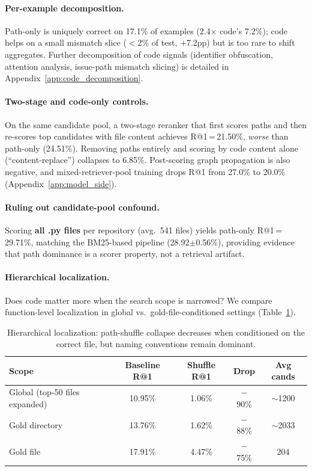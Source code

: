 \documentclass{article}
\begin{document}
\paragraph{Per-example decomposition.}
Path-only is uniquely correct on 17.1\% of examples (2.4$\times$ code's 7.2\%); code helps on a small mismatch slice ($<$2\% of test, $+$7.2pp) but is too rare to shift aggregates.
Further decomposition of code signals (identifier obfuscation, attention analysis, issue-path mismatch slicing) is detailed in Appendix~\ref{app:code_decomposition}.

\paragraph{Two-stage and code-only controls.}
On the same candidate pool, a two-stage reranker that first scores paths and then re-scores top candidates with file content achieves R@1\,=\,21.50\%, \emph{worse} than path-only (24.51\%).
Removing paths entirely and scoring by code content alone (``content-replace'') collapses to 6.85\%.
Post-scoring graph propagation is also negative, and mixed-retriever-pool training drops R@1 from 27.0\% to 20.0\% (Appendix~\ref{app:model_side}).

\paragraph{Ruling out candidate-pool confound.}
Scoring \textbf{all .py files} per repository (avg.\ 541 files) yields path-only R@1\,=\,29.71\%, matching the BM25-based pipeline (28.92$\pm$0.56\%), providing evidence that path dominance is a scorer property, not a retrieval artifact.

\paragraph{Hierarchical localization.}
Does code matter more when the search scope is narrowed?
We compare function-level localization in global vs.\ gold-file-conditioned settings (Table~\ref{tab:hierarchical}).

\begin{table}[h]
\centering
\caption{Hierarchical localization: path-shuffle collapse decreases when conditioned on the correct file, but naming conventions remain dominant.}
\label{tab:hierarchical}
\small
\begin{tabular}{lcccc}
\toprule
\textbf{Scope} & \textbf{Baseline R@1} & \textbf{Shuffle R@1} & \textbf{Drop} & \textbf{Avg cands} \\
\midrule
Global (top-50 files expanded) & 10.95\% & 1.06\% & $-$90\% & $\sim$1200 \\
Gold directory & 13.76\% & 1.62\% & $-$88\% & $\sim$2033 \\
Gold file & 17.91\% & 4.47\% & $-$75\% & 204 \\
\bottomrule
\end{tabular}
\end{table}
\end{document}
